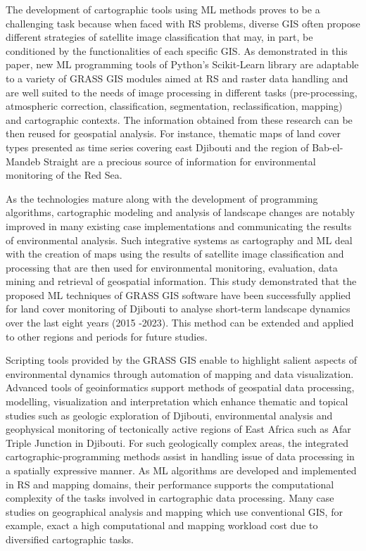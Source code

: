 \documentclass[jimaging,article,submit,pdftex,moreauthors]{Definitions/mdpi}
\begin{document}
The development of cartographic tools using ML methods proves to be a challenging task because when faced with RS problems, diverse GIS often propose different strategies of satellite image classification that may, in part, be conditioned by the functionalities of each specific GIS. As demonstrated in this paper, new ML programming tools of Python's Scikit-Learn library are adaptable to a variety of GRASS GIS modules aimed at RS and raster data handling and are well suited to the needs of image processing in different tasks (pre-processing, atmospheric correction, classification, segmentation, reclassification, mapping) and cartographic contexts. The information obtained from these research can be then reused for geospatial analysis. For instance, thematic maps of land cover types presented as time series covering east Djibouti and the region of Bab-el-Mandeb Straight are a precious source of information for environmental monitoring of the Red Sea. 

As the technologies mature along with the development of programming algorithms, cartographic modeling and analysis of landscape changes are notably improved in many existing case implementations and communicating the results of environmental analysis. Such integrative systems as cartography and ML deal with the creation of maps using the results of satellite image classification and processing that are then used for environmental monitoring, evaluation, data mining and retrieval of geospatial information. This study demonstrated that the proposed ML techniques of GRASS GIS software have been successfully applied for land cover monitoring of Djibouti to analyse short-term landscape dynamics over the last eight years (2015 -2023). This method can be extended and applied to other regions and periods for future studies. 

Scripting tools provided by the GRASS GIS enable to highlight salient aspects of environmental dynamics through automation of mapping and data visualization. Advanced tools of geoinformatics support methods of geospatial data processing, modelling, visualization and interpretation which enhance thematic and topical studies such as geologic exploration of Djibouti, environmental analysis and geophysical monitoring of tectonically active regions of East Africa such as Afar Triple Junction in Djibouti. For such geologically complex areas, the integrated cartographic-programming methods assist in handling issue of data processing in a spatially expressive manner. As ML algorithms are developed and implemented in RS and mapping domains, their performance supports the computational complexity of the tasks involved in cartographic data processing. Many case studies on geographical analysis and mapping which use conventional GIS, for example, exact a high computational and mapping workload cost due to diversified cartographic tasks. 
\end{document}
